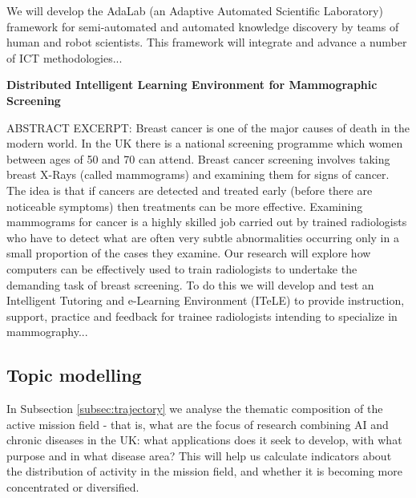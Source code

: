 \documentclass[11pt]{article}
\begin{document}
\begin{tcolorbox}[fontupper=\small, parbox=false]
We will develop the AdaLab (an Adaptive Automated Scientific Laboratory) framework for semi-automated and automated knowledge discovery by teams of human and robot scientists. This framework will integrate and advance a number of ICT methodologies...

\textbf{Distributed Intelligent Learning Environment for Mammographic Screening}

ABSTRACT EXCERPT: Breast cancer is one of the major causes of death in the modern world. In the UK there is a national screening programme which women between ages of 50 and 70 can attend. Breast cancer screening involves taking breast X-Rays (called mammograms) and examining them for signs of cancer. The idea is that if cancers are detected and treated early (before there are noticeable symptoms) then treatments can be more effective. Examining mammograms for cancer is a highly skilled job carried out by trained radiologists who have to detect what are often very subtle abnormalities occurring only in a small proportion of the cases they examine. Our research will explore how computers can be effectively used to train radiologists to undertake the demanding task of breast screening. To do this we will develop and test an Intelligent Tutoring and e-Learning Environment (ITeLE) to provide instruction, support, practice and feedback for trainee radiologists intending to specialize in mammography...
\end{tcolorbox}

\subsection{Topic modelling}
\label{subsec:topic}

In Subsection \ref{subsec:trajectory} we analyse the thematic composition of the active mission field - that is, what are the focus of research combining AI and chronic diseases in the UK: what applications does it seek to develop, with what purpose and in what disease area? This will help us calculate indicators about the distribution of activity in the mission field, and whether it is becoming more concentrated or diversified. 
\end{document}
